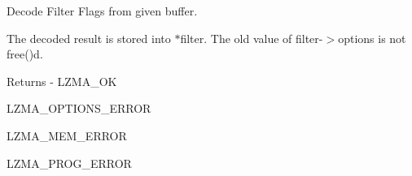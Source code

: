 Decode Filter Flags from given buffer. 

The decoded result is stored into $\ast$filter. The old value of filter-\/$>$options is not free()d.

\begin{DoxyReturn}{Returns}
-\/ L\+Z\+M\+A\+\_\+\+OK
\begin{DoxyItemize}
\item L\+Z\+M\+A\+\_\+\+O\+P\+T\+I\+O\+N\+S\+\_\+\+E\+R\+R\+OR
\item L\+Z\+M\+A\+\_\+\+M\+E\+M\+\_\+\+E\+R\+R\+OR
\item L\+Z\+M\+A\+\_\+\+P\+R\+O\+G\+\_\+\+E\+R\+R\+OR 
\end{DoxyItemize}
\end{DoxyReturn}
